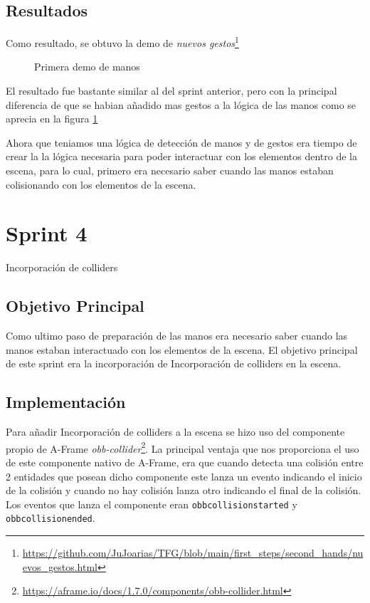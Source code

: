 \documentclass[a4paper, 12pt]{book}
\begin{document}
\subsection{Resultados}
\label{subsec:resultados3}
Como resultado, se obtuvo la demo de \textit{nuevos gestos}\footnote{\url{https://github.com/JuJoarias/TFG/blob/main/first_steps/second_hands/nuevos_gestos.html}}

\begin{figure}[H] 
  \centering
  \fbox{\rule{0pt}{150pt} \rule{0.7\textwidth}{0pt}} 
  \caption{Primera demo de manos}
  \label{fig:sprint3}
\end{figure}

El resultado fue bastante similar al del sprint anterior, pero con la principal diferencia de que se habian añadido mas gestos a la lógica de las manos como se aprecia en la figura \ref{fig:sprint3}

Ahora que teniamos una lógica de detección de manos y de gestos era tiempo de crear la la lógica necesaria para poder interactuar con los elementos dentro de la escena, para lo cual, primero era necesario saber cuando las manos estaban colisionando con los elementos de la escena. 
\section{Sprint 4}
\label{sec:sprint4}
Incorporación de colliders  

\subsection{Objetivo Principal}
\label{subsec:objetivo-principal4}
Como ultimo paso de preparación de las manos era necesario saber cuando las manos estaban interactuado con los elementos de la escena. El objetivo principal de este sprint era la incorporación de Incorporación de colliders  
en la escena. 


\subsection{Implementación}
\label{subsec:implementacion4}
Para añadir Incorporación de colliders  
a la escena se hizo uso del componente propio de A-Frame \textit{obb-collider}\footnote{\url{https://aframe.io/docs/1.7.0/components/obb-collider.html}}.
La principal ventaja que nos proporciona el uso de este componente nativo de A-Frame, era que cuando detecta una colisión entre 2 entidades que posean dicho componente este lanza un evento indicando el inicio de la colisión y cuando no hay colisión lanza otro indicando el final de la colisión.
Los eventos que lanza el componente eran \texttt{obbcollisionstarted} y \texttt{obbcollisionended}.
\end{document}
